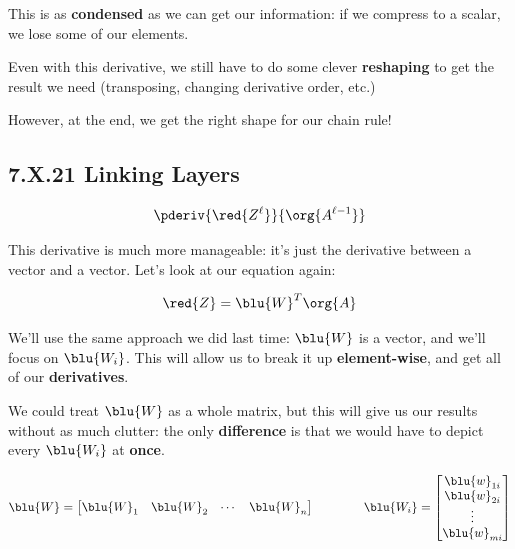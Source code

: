         This is as \textbf{condensed} as we can get our information: if we compress to a scalar, we lose some of our elements.
        
        Even with this derivative, we still have to do some clever \textbf{reshaping} to get the result we need (transposing, changing derivative order, etc.)
        
        However, at the end, we get the right shape for our chain rule!
        
    \secdiv
            
    \subsection*{7.X.21 \quad Linking Layers}
                
        \begin{equation}
            \pderiv{\red{Z^\ell}} {\org{A^{\ell-1}}}
        \end{equation}
        
        This derivative is much more manageable: it's just the derivative between a vector and a vector. Let's look at our equation again:
        
        \begin{equation}
            \red{Z} = \blu{W}^T\org{A}
        \end{equation}
        
        We'll use the same approach we did last time: $\blu{W}$ is a vector, and we'll focus on $\blu{W_i}$. This will allow us to break it up \textbf{element-wise}, and get all of our \textbf{derivatives}.
        
        We could treat $\blu{W}$ as a whole matrix, but this will give us our results without as much clutter: the only \textbf{difference} is that we would have to depict every $\blu{W_i}$ at \textbf{once}.
        
        \begin{equation}
            \blu{W}
            =
            \begin{bmatrix}
                \blu{W}_1 & \blu{W}_2 & \cdots & \blu{W}_n
            \end{bmatrix}
            \qquad\qquad
            \blu{W_i} = 
            \begin{bmatrix}
                \blu{w}_{1i} \\ \blu{w}_{2i} \\ \vdots \\ \blu{w}_{mi}
            \end{bmatrix}
        \end{equation}
        
